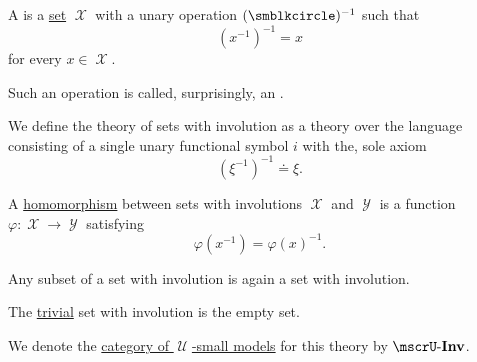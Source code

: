 \begin{definition}\label{def:set_with_involution}\mimprovised
  A  is a \hyperref[def:set]{set} \( \mscrX \) with a unary operation \( (\anon)^{-1} \) such that
  \begin{equation*}
    (x^{-1})^{-1} = x
  \end{equation*}
  for every \( x \in \mscrX \).

  Such an operation is called, surprisingly, an .

  \begin{thmenum}
     We define the theory of sets with involution as a theory over the language consisting of a single unary functional symbol \( i \) with the, sole axiom
    \begin{equation}\label{eq:def:set_with_involution/theory/axiom}
      (\xi^{-1})^{-1} \doteq \xi.
    \end{equation}

     A \hyperref[def:first_order_homomorphism]{homomorphism} between sets with involutions \( \mscrX \) and \( \mscrY \) is a function \( \varphi: \mscrX \to \mscrY \) satisfying
    \begin{equation}\label{eq:def:set_with_involution/homomorphism}
      \varphi(x^{-1})
      =
      \varphi(x)^{-1}.
    \end{equation}

     Any subset of a set with involution is again a set with involution.

     The \hyperref[thm:substructures_form_complete_lattice/bottom]{trivial} set with involution is the empty set.

     We denote the \hyperref[def:category_of_small_first_order_models]{category of \( \mscrU \)-small models} for this theory by \( \ucat{Inv} \).
  \end{thmenum}
\end{definition}

